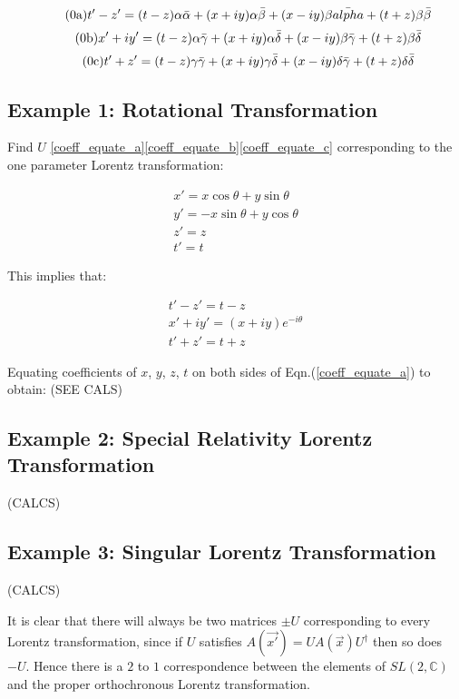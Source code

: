 \begin{equation}\label{coeff_equate_a}
\tag{{\theequation}a}
t' - z' = (t-z)\alpha\bar{\alpha} + (x + iy)\alpha\bar{\beta} + (x - iy)\beta\bar{alpha} + (t+z)\beta\bar{\beta}
\end{equation}
\begin{equation}\label{coeff_equate_b}
\tag{{\theequation}b}
x' + iy' = (t-z)\alpha\bar{\gamma} + (x + iy)\alpha\bar{\delta} + (x-iy)\beta\bar{\gamma} + (t+z)\beta\bar{\delta}
\end{equation}
\begin{equation}\label{coeff_equate_c}
\tag{{\theequation}c}
t' + z' = (t-z)\gamma\bar{\gamma} + (x + iy)\gamma\bar{\delta} + (x-iy)\delta\bar{\gamma} + (t+z)\delta\bar{\delta}
\end{equation}

\subsection{Example 1: Rotational Transformation}

\noindent Find $U$ \ref{coeff_equate_a}\ref{coeff_equate_b}\ref{coeff_equate_c} corresponding to the one parameter Lorentz transformation:

\begin{eqnarray*} 
x' = x\cos{\theta} + y\sin{\theta} \\
y' = -x\sin{\theta} + y\cos{\theta} \\
z' = z \\
t' = t
\end{eqnarray*} 

\noindent This implies that:

\begin{eqnarray*}
t'-z' = t-z \\
x'+iy' = (x+iy) e^{-i \theta} \\
t'+z' = t+z
\end{eqnarray*}

Equating coefficients of $x$, $y$, $z$, $t$ on both sides of Eqn.(\ref{coeff_equate_a}) to obtain: (SEE CALS)

\subsection{Example 2: Special Relativity Lorentz Transformation}\label{Special_Linear_Matrices_Example_2}

(CALCS)

\subsection{Example 3: Singular Lorentz Transformation}\label{Special_Linear_Matrices_Example_3}

(CALCS)

It is clear that there will always be two matrices $\pm U$ corresponding to every Lorentz transformation, since if $U$ satisfies $A(\vec{x'}) = U A(\vec{x}) U^{\dagger}$ then so does $-U$. Hence there is a $2$ to $1$ correspondence between the elements of $SL(2,\mathbb{C})$ and the proper orthochronous Lorentz transformation.

